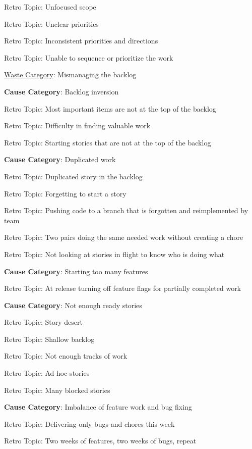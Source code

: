 \quad \quad \quad Retro Topic: Unfocused scope

\quad \quad \quad Retro Topic: Unclear priorities

\quad \quad \quad Retro Topic: Inconsistent priorities and directions

\quad \quad \quad Retro Topic: Unable to sequence or prioritize the work


\underline{Waste Category}: Mismanaging the backlog

\quad \textbf{Cause Category}: Backlog inversion

\quad \quad Retro Topic: Most important items are not at the top of the backlog

\quad \quad Retro Topic: Difficulty in finding valuable work

\quad \quad Retro Topic: Starting stories that are not at the top of the backlog

\quad \textbf{Cause Category}: Duplicated work

\quad \quad Retro Topic: Duplicated story in the backlog

\quad \quad Retro Topic: Forgetting to start a story

\quad \quad Retro Topic: Pushing code to a branch that is forgotten and reimplemented by team

\quad \quad Retro Topic: Two pairs doing the same needed work without creating a chore

\quad \quad Retro Topic: Not looking at stories in flight to know who is doing what

\quad \textbf{Cause Category}: Starting too many features

\quad \quad Retro Topic: At release turning off feature flags for partially completed work

\quad \textbf{Cause Category}: Not enough ready stories

\quad \quad Retro Topic: Story desert

\quad \quad Retro Topic: Shallow backlog

\quad \quad Retro Topic: Not enough tracks of work

\quad \quad Retro Topic: Ad hoc stories

\quad \quad Retro Topic: Many blocked stories

\quad \textbf{Cause Category}: Imbalance of feature work and bug fixing

\quad \quad Retro Topic: Delivering only bugs and chores this week

\quad \quad Retro Topic: Two weeks of features, two weeks of bugs, repeat

